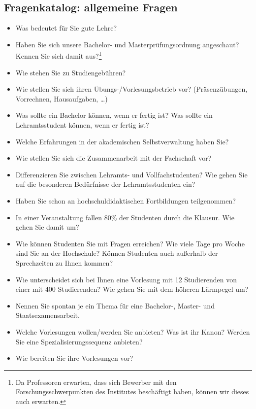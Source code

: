 \subsection{Fragenkatalog: allgemeine Fragen}
\begin{itemize}
    \item Was bedeutet für Sie gute Lehre?
    \item Haben Sie sich unsere Bachelor- und Masterprüfungsordnung angeschaut?
          Kennen Sie sich damit aus?\footnote{%
              Da Professoren erwarten, dass sich Bewerber mit den Forschungsschwerpunkten des Institutes beschäftigt haben, können wir dieses auch erwarten.%
          }
    \item Wie stehen Sie zu Studiengebühren?
    \item Wie stellen Sie sich ihren Übungs-/Vorlesungsbetrieb vor?
          (Präsenzübungen, Vorrechnen, Hausaufgaben, …)
    \item Was sollte ein Bachelor können, wenn er fertig ist?
          Was sollte ein Lehramtsstudent können, wenn er fertig ist?
    \item Welche Erfahrungen in der akademischen Selbstverwaltung haben Sie?
    \item Wie stellen Sie sich die Zusammenarbeit mit der Fachschaft vor?
    \item Differenzieren Sie zwischen Lehramts- und Vollfachstudenten?
          Wie gehen Sie auf die besonderen Bedürfnisse der Lehramtsstudenten ein?
    \item Haben Sie schon an hochschuldidaktischen Fortbildungen teilgenommen?
    \item In einer Veranstaltung fallen 80\% der Studenten durch die Klausur.
          Wie gehen Sie damit um?
    \item Wie können Studenten Sie mit Fragen erreichen?
          Wie viele Tage pro Woche sind Sie an der Hochschule?
          Können Studenten auch außerhalb der Sprechzeiten zu Ihnen kommen?
    \item Wie unterscheidet sich bei Ihnen eine Vorlesung mit 12 Studierenden von einer mit 400 Studierenden?
          Wie gehen Sie mit dem höheren Lärmpegel um?
    \item Nennen Sie spontan je ein Thema für eine Bachelor-, Master- und Staatsexamensarbeit.
    \item Welche Vorlesungen wollen/werden Sie anbieten?
          Was ist ihr Kanon?
          Werden Sie eine Spezialisierungssequenz anbieten?
    \item Wie bereiten Sie ihre Vorlesungen vor?

\end{itemize}
